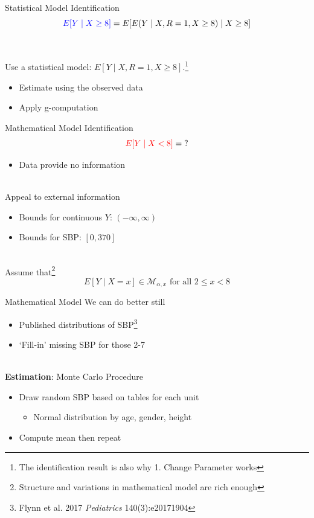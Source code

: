 \documentclass{beamer}
\begin{document}

\begin{frame}{Statistical Model}
	Identification
	$$ {\color{blue} E[Y \mid X \ge 8]} = E[E(Y \mid X, R=1, X \ge 8) \mid X \ge 8] $$
	\\~\\
	Use a statistical model: $E[Y \mid X,R=1,X \ge 8]$.\footnote[frame]{The identification result is also why 1. Change Parameter works}
	\begin{itemize}
		\item Estimate using the observed data
		\item Apply g-computation
	\end{itemize}
\end{frame}

\begin{frame}{Mathematical Model}
	Identification  
	$$ {\color{red} E[Y \mid X < 8]} = \; ?$$
	\begin{itemize}
		\item Data provide no information
	\end{itemize}
	~\\
	Appeal to external information
	\begin{itemize}
		\item Bounds for continuous $Y$: $(-\infty, \infty)$
		\item Bounds for SBP: $[0, 370]$
	\end{itemize}
	~\\
	Assume that\footnote[frame]{Structure and variations in mathematical model are rich enough}
	$$ E[Y \mid X=x] \in \mathcal{M}_{\alpha,x} \text{ for all } 2 \le x < 8$$
\end{frame}

\begin{frame}{Mathematical Model}
	We can do better still
	\begin{itemize}
		\item Published distributions of SBP\footnote[frame]{Flynn et al. 2017 \textit{Pediatrics} 140(3):e20171904}
		\item `Fill-in' missing SBP for those 2-7
	\end{itemize}
	~\\
	\textbf{Estimation}: Monte Carlo Procedure
	\begin{itemize}
		\item Draw random SBP based on tables for each unit
		\begin{itemize}
			\item Normal distribution by age, gender, height
		\end{itemize}
		\item Compute mean then repeat
	\end{itemize}
\end{frame}
\end{document}
